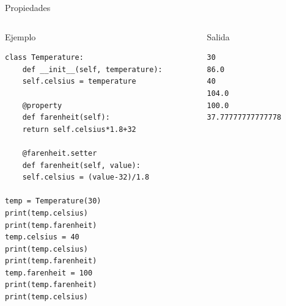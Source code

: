 \documentclass[bigger,unknownkeysallowed]{beamer}
\begin{document}
\begin{frame}[fragile,label={sec:orge4bc742}]{Propiedades}
 \begin{columns}
\begin{column}{0.75\columnwidth}
\begin{exampleblock}{Ejemplo}
\begin{verbatim}
class Temperature:
    def __init__(self, temperature):
	self.celsius = temperature

    @property
    def farenheit(self):
	return self.celsius*1.8+32

    @farenheit.setter
    def farenheit(self, value):
	self.celsius = (value-32)/1.8

temp = Temperature(30)
print(temp.celsius)
print(temp.farenheit)
temp.celsius = 40
print(temp.celsius)
print(temp.farenheit)
temp.farenheit = 100
print(temp.farenheit)
print(temp.celsius)
\end{verbatim}
\end{exampleblock}
\end{column}
\begin{column}{0.25\columnwidth}
\begin{block}{Salida}
\scriptsize
\begin{verbatim}
30
86.0
40
104.0
100.0
37.77777777777778
\end{verbatim}
\end{block}
\end{column}
\end{columns}
\end{frame}
\end{document}
